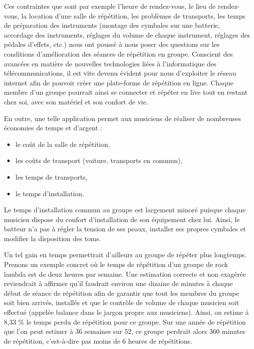 \documentclass[a4,12pt]{article}
\begin{document}
Ces contraintes que sont par exemple l'heure de rendez-vous, le lieu de rendez-vous, la
location d'une salle de répétition, les problèmes de transports, les temps de préparation des
instruments (montage des cymbales sur une batterie, accordage des instruments, réglages du
volume de chaque instrument, réglages des pédales d'effets, etc.) nous ont poussé à nous poser
des questions sur les conditions d'amélioration des séances de répétition en groupe.
Conscient des avancées en matière de nouvelles technologies liées à l'informatique des
télécommunications, il est vite devenu évident pour nous d'exploiter le réseau internet afin
de pouvoir créer une plate-forme de répétition en ligne. Chaque membre d'un groupe
pourrait ainsi se connecter et répéter en live tout en restant chez soi, avec son matériel
et son confort de vie.

En outre, une telle application permet aux musiciens de réaliser de nombreuses
économies de temps et d'argent :

\begin{itemize}
\item le coût de la salle de répétition,
\item les coûts de transport (voiture, transports en commun),
\item les temps de transports,
\item le temps d'installation.
\end{itemize}

Le temps d'installation commun au groupe est largement minoré puisque chaque
musicien dispose du confort d'installation de son équipement chez lui. Ainsi, le
batteur n'a pas à régler la tension de ses peaux, installer ses propres cymbales
et modifier la disposition des toms.

Un tel gain en temps permettrait d'ailleurs au groupe de répéter plus longtemps. Prenons
un exemple concret où le temps de répétition d'un groupe de rock lambda est de deux heures
par semaine. Une estimation correcte et non exagérée reviendrait à affirmer qu'il faudrait
environ une dizaine de minutes à chaque début de séance de répétition afin de garantir que
tout les membres du groupe soit bien arrivés, installés et que le contrôle de volume de
chaque musicien soit effectué (appelée balance dans le jargon propre aux musiciens). Ainsi,
on estime à 8,33 \% le temps perdu de répétition pour ce groupe. Sur une année de répétition
que l'on peut estimer à 36 semaines sur 52, ce groupe perdrait alors 360 minutes de
répétition, c'est-à-dire pas moins de 6 heures de répétitions.\\
\end{document}
